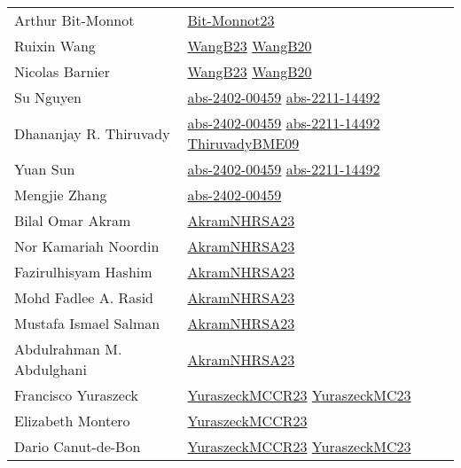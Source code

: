{\begin{longtable}{p{4cm}p{15cm}}
Arthur Bit{-}Monnot & \href{papers/Bit-Monnot23.pdf}{Bit-Monnot23}\cite{Bit-Monnot23} \\
Ruixin Wang & \href{papers/WangB23.pdf}{WangB23}\cite{WangB23} \href{papers/WangB20.pdf}{WangB20}\cite{WangB20} \\
Nicolas Barnier & \href{papers/WangB23.pdf}{WangB23}\cite{WangB23} \href{papers/WangB20.pdf}{WangB20}\cite{WangB20} \\
Su Nguyen & \href{articles/abs-2402-00459.pdf}{abs-2402-00459}\cite{abs-2402-00459} \href{articles/abs-2211-14492.pdf}{abs-2211-14492}\cite{abs-2211-14492} \\
Dhananjay R. Thiruvady & \href{articles/abs-2402-00459.pdf}{abs-2402-00459}\cite{abs-2402-00459} \href{articles/abs-2211-14492.pdf}{abs-2211-14492}\cite{abs-2211-14492} \href{papers/ThiruvadyBME09.pdf}{ThiruvadyBME09}\cite{ThiruvadyBME09} \\
Yuan Sun & \href{articles/abs-2402-00459.pdf}{abs-2402-00459}\cite{abs-2402-00459} \href{articles/abs-2211-14492.pdf}{abs-2211-14492}\cite{abs-2211-14492} \\
Mengjie Zhang & \href{articles/abs-2402-00459.pdf}{abs-2402-00459}\cite{abs-2402-00459} \\
Bilal Omar Akram & \href{articles/AkramNHRSA23.pdf}{AkramNHRSA23}\cite{AkramNHRSA23} \\
Nor Kamariah Noordin & \href{articles/AkramNHRSA23.pdf}{AkramNHRSA23}\cite{AkramNHRSA23} \\
Fazirulhisyam Hashim & \href{articles/AkramNHRSA23.pdf}{AkramNHRSA23}\cite{AkramNHRSA23} \\
Mohd Fadlee A. Rasid & \href{articles/AkramNHRSA23.pdf}{AkramNHRSA23}\cite{AkramNHRSA23} \\
Mustafa Ismael Salman & \href{articles/AkramNHRSA23.pdf}{AkramNHRSA23}\cite{AkramNHRSA23} \\
Abdulrahman M. Abdulghani & \href{articles/AkramNHRSA23.pdf}{AkramNHRSA23}\cite{AkramNHRSA23} \\
Francisco Yuraszeck & \href{articles/YuraszeckMCCR23.pdf}{YuraszeckMCCR23}\cite{YuraszeckMCCR23} \href{papers/YuraszeckMC23.pdf}{YuraszeckMC23}\cite{YuraszeckMC23} \\
Elizabeth Montero & \href{articles/YuraszeckMCCR23.pdf}{YuraszeckMCCR23}\cite{YuraszeckMCCR23} \\
Dario Canut{-}de{-}Bon & \href{articles/YuraszeckMCCR23.pdf}{YuraszeckMCCR23}\cite{YuraszeckMCCR23} \href{papers/YuraszeckMC23.pdf}{YuraszeckMC23}\cite{YuraszeckMC23} \\

\end{longtable}}
